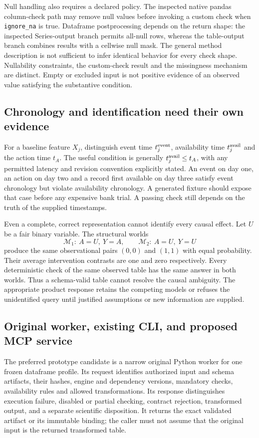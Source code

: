 Null handling also requires a declared policy. The inspected native pandas
column-check path may remove null values before invoking a custom check when
\texttt{ignore\_na} is true. Dataframe postprocessing depends on the return
shape: the inspected Series-output branch permits all-null rows, whereas the
table-output branch combines results with a cellwise null mask. The general
method description is not sufficient to infer identical behavior for every
check shape. Nullability constraints, the custom-check result and the missingness
mechanism are distinct. Empty or excluded input is not positive evidence of
an observed value satisfying the substantive condition.
\citep{exec24_pandera_source}

\subsection{Chronology and identification need their own evidence}
For a baseline feature $X_j$, distinguish event time $t_j^{\rm event}$,
availability time $t_j^{\rm avail}$ and the action time $t_A$. The useful
condition is generally $t_j^{\rm avail}\leq t_A$, with any permitted latency
and revision convention explicitly stated. An event on day one, an action on
day two and a record first available on day three satisfy event chronology
but violate availability chronology. A generated fixture should expose that
case before any expensive bank trial. A passing check still depends on the
truth of the supplied timestamps.\citep{exec24_pandera_reference}

Even a complete, correct representation cannot identify every causal effect.
Let $U$ be a fair binary variable. The structural worlds
\begin{equation}
 \mathcal M_1:\ A=U,\ Y=A,
 \qquad
 \mathcal M_2:\ A=U,\ Y=U
\end{equation}
produce the same observational pairs $(0,0)$ and $(1,1)$ with equal probability.
Their average intervention contrasts are one and zero respectively. Every
deterministic check of the same observed table has the same answer in both
worlds. Thus a schema-valid table cannot resolve the causal ambiguity.
The appropriate product response retains the competing models or refuses the
unidentified query until justified assumptions or new information are supplied.
\citep{exec24_pandera_reference}

\subsection{Original worker, existing CLI, and proposed MCP service}
The preferred prototype candidate is a narrow original Python worker for one
frozen dataframe profile. Its request identifies authorized input and schema
artifacts, their hashes, engine and dependency versions, mandatory checks,
availability rules and allowed transformations. Its response distinguishes
execution failure, disabled or partial checking, contract rejection, transformed
output, and a separate scientific disposition. It returns the exact validated
artifact or its immutable binding; the caller must not assume that the original
input is the returned transformed table.

